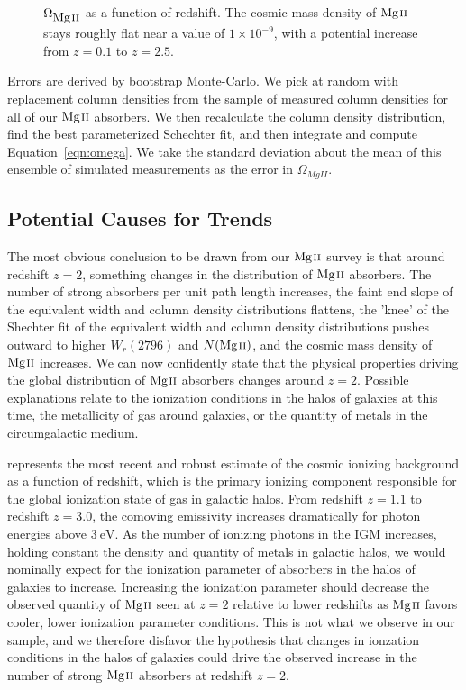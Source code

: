 \documentclass[iop,apj,numberedappendix,appendixfloats,twocolappendix]{emulateapj}
\begin{document}
\begin{figure*}[bth]
\caption{$\Omega_{\hbox{{\rm Mg}\kern 0.1em{\sc ii}}}$ as a function of redshift. The cosmic mass density of ${\hbox{{\rm Mg}\kern 0.1em{\sc ii}}}$ stays roughly flat near a value of $1 \times 10^{-9}$, with a potential increase from $z = 0.1$ to $z = 2.5$.}
\label{fig:omegamgii}
\end{figure*}

Errors are derived by bootstrap Monte-Carlo. We pick at random with replacement column densities from the sample of measured column densities for all of our ${\hbox{{\rm Mg}\kern 0.1em{\sc ii}}}$ absorbers. We then recalculate the column density distribution, find the best parameterized Schechter fit, and then integrate and compute Equation~\ref{eqn:omega}. We take the standard deviation about the mean of this ensemble of simulated measurements as the error in $\Omega_{MgII}$. 

\subsection{Potential Causes for Trends}
\label{trendcauses}

The most obvious conclusion to be drawn from our ${\hbox{{\rm Mg}\kern 0.1em{\sc ii}}}$ survey is that around redshift $z = 2$, something changes in the distribution of ${\hbox{{\rm Mg}\kern 0.1em{\sc ii}}}$ absorbers. The number of strong absorbers per unit path length increases, the faint end slope of the equivalent width and column density distributions flattens, the 'knee' of the Shechter fit of the equivalent width and column density distributions pushes outward to higher $W_r(2796)$ and $N(\hbox{{\rm Mg}\kern 0.1em{\sc ii}})$, and the cosmic mass density of ${\hbox{{\rm Mg}\kern 0.1em{\sc ii}}}$ increases. We can now confidently state that the physical properties driving the global distribution of ${\hbox{{\rm Mg}\kern 0.1em{\sc ii}}}$ absorbers changes around $z = 2$. Possible explanations relate to the ionization conditions in the halos of galaxies at this time, the metallicity of gas around galaxies, or the quantity of metals in the circumgalactic medium.

\cite{Haardt2012} represents the most recent and robust estimate of the cosmic ionizing background as a function of redshift, which is the primary ionizing component responsible for the global ionization state of gas in galactic halos. From redshift $z = 1.1$ to redshift $z = 3.0$, the comoving emissivity increases dramatically for photon energies above $3~\mathrm{eV}$. As the number of ionizing photons in the IGM increases, holding constant the density and quantity of metals in galactic halos, we would nominally expect for the ionization parameter of absorbers in the halos of galaxies to increase. Increasing the ionization parameter should decrease the observed quantity of ${\hbox{{\rm Mg}\kern 0.1em{\sc ii}}}$ seen at $z = 2$ relative to lower redshifts as ${\hbox{{\rm Mg}\kern 0.1em{\sc ii}}}$ favors cooler, lower ionization parameter conditions. This is not what we observe in our sample, and we therefore disfavor the hypothesis that changes in ionzation conditions in the halos of galaxies could drive the observed increase in the number of strong ${\hbox{{\rm Mg}\kern 0.1em{\sc ii}}}$ absorbers at redshift $z = 2$. 
\end{document}
